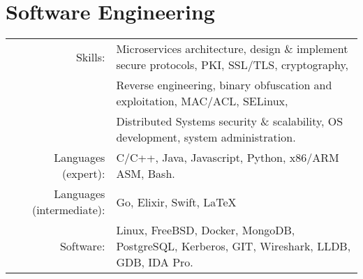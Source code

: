 \documentclass[lettersize,10pt]{article}
\begin{document}
\section{Software Engineering}
\begin{tabular}{rl}
Skills:& Microservices architecture, design \& implement secure protocols, PKI, SSL/TLS, cryptography, \\
       & Reverse engineering, binary obfuscation and exploitation, MAC/ACL, SELinux, \\
       & Distributed Systems security \& scalability, OS development, system administration. \\
Languages (expert):& C/C++, Java, Javascript, Python, x86/ARM ASM, Bash.\\
Languages (intermediate):& Go, Elixir, Swift, \LaTeX \\
Software:& Linux, FreeBSD, Docker, MongoDB, PostgreSQL, Kerberos, GIT, Wireshark, LLDB, GDB, IDA Pro.\\
\end{tabular}


\end{document}

